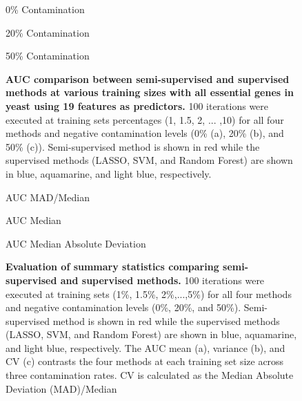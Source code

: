 \documentclass{bmcart}
\def\texttt{[image: ]}
\begin{document}
\begin{backmatter}
\begin{figure}[ht]
    \centering
        \centering
        \caption{0\% Contamination}
    \centering
        \centering
        \caption{20\% Contamination}
    \centering
        \centering
        \caption{50\% Contamination}
    \vspace{1cm}
    \caption{\textbf{AUC comparison between semi-supervised and supervised methods at various training sizes with all essential genes in yeast using 19 features as predictors.} 100 iterations were executed at training sets percentages  (1, 1.5, 2, ... ,10) for all four methods and negative contamination levels (0\% (a), 20\% (b), and 50\% (c)). Semi-supervised method is shown in red while the supervised methods (LASSO, SVM, and Random Forest) are shown in blue, aquamarine, and light blue, respectively.}
    \label{fig:AUCboxplots}
\end{figure}

\begin{figure}[ht]
    \centering
        \caption{AUC MAD/Median}
        \caption{AUC Median}
        \caption{AUC Median Absolute Deviation}
    \vspace{1cm}
    \caption{\textbf{Evaluation of summary statistics comparing semi-supervised and supervised methods.} 100 iterations were executed at training sets (1\%, 1.5\%, 2\%,...,5\%) for all four methods and negative contamination levels (0\%, 20\%, and 50\%). Semi-supervised method is shown in red while the supervised methods (LASSO, SVM, and Random Forest) are shown in blue, aquamarine, and light blue, respectively. The AUC mean (a), variance (b), and CV (c) contrasts the four methods at each training set size across three contamination rates. CV is calculated as the Median Absolute Deviation (MAD)/Median}
    \label{fig:AUCsummarymedian}
\end{figure}


\end{backmatter}
\end{document}
